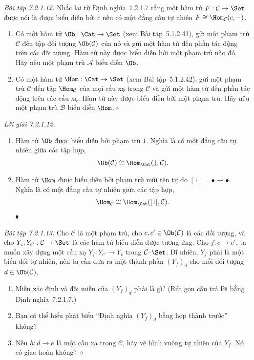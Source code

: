 \noindent\textit{Bài tập 7.2.1.12.}\keepwithnext
Nhắc lại từ Định nghĩa~7.2.1.7 rằng một hàm tử $F:\mathcal C\to\Set$ được nói là được biểu diễn bởi $c$ nếu có một đẳng cấu tự nhiên $F\cong\Hom_{\mathcal C}(c,-)$.
\begin{enumerate}[label=\alph*.]
\item Có một hàm tử $\Ob:\Cat\to\Set$ (xem Bài tập~5.1.2.41), gửi một phạm trù $\mathcal C$ đến tập đối tượng $\Ob(\mathcal C)$ của nó và gửi một hàm tử đến phần tác động trên các đối tượng. Hàm tử này được biểu diễn bởi một phạm trù nào đó. Hãy nêu một phạm trù $\mathcal A$ biểu diễn $\Ob$.
\item Có một hàm tử $\Hom:\Cat\to\Set$ (xem Bài tập~5.1.2.42), gửi một phạm trù $\mathcal C$ đến tập $\Hom_{\mathcal C}$ của mọi cấu xạ trong $\mathcal C$ và gửi một hàm tử đến phần tác động trên các cấu xạ. Hàm tử này được biểu diễn bởi một phạm trù. Hãy nêu một phạm trù $\mathcal B$ biểu diễn $\Hom$.\unskip\nobreak\hfill\mbox{$\diamond$}\par
\end{enumerate}

\noindent\textit{Lời giải 7.2.1.12.}\keepwithnext
\begin{enumerate}[label=\alph*.]
\item Hàm tử $\Ob$ được biểu diễn bởi phạm trù $\underline1$. Nghĩa là có một đẳng cấu tự nhiên giữa các tập hợp,
\[
\Ob(\mathcal C)\cong\Hom_{\Cat}(\underline1,\mathcal C).
\]
\item Hàm tử $\Hom$ được biểu diễn bởi phạm trù mũi tên tự do $[1]=\boxed{\bullet\longrightarrow\bullet}$. Nghĩa là có một đẳng cấu tự nhiên giữa các tập hợp,
\[
\Hom_{\mathcal C}\cong\Hom_{\Cat}([1],\mathcal C).
\]
\nobreak\hfill$\blacklozenge$
\end{enumerate}

\noindent\textit{Bài tập 7.2.1.13.}\keepwithnext
Cho $\mathcal C$ là một phạm trù, cho $c,c'\in\Ob(\mathcal C)$ là các đối tượng, và cho $Y_c,Y_{c'}:\mathcal C\to\Set$ là các hàm tử biểu diễn được tương ứng. Cho $f:c\to c'$, ta muốn xây dựng một cấu xạ $Y_f:Y_{c'}\to Y_c$ trong $\mathcal C\text{--}\Set$. Dĩ nhiên, $Y_f$ phải là một biến đổi tự nhiên, nên ta cần đưa ra một thành phần $(Y_f)_d$ cho mỗi đối tượng $d\in\Ob(\mathcal C)$.
\begin{enumerate}[label=\alph*.]
\item Miền xác định và đối miền của $(Y_f)_d$ phải là gì? (Rút gọn câu trả lời bằng Định nghĩa~7.2.1.7.)
\item Bạn có thể hiểu phát biểu ``Định nghĩa $(Y_f)_d$ bằng hợp thành trước'' không?
\item Nếu $h:d\to e$ là một cấu xạ trong $\mathcal C$, hãy vẽ hình vuông tự nhiên của $Y_f$. Nó có giao hoán không?
\nobreak\hfill$\diamond$
\end{enumerate}

